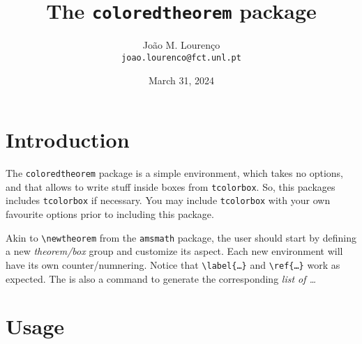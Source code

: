 \documentclass{article}
\newcommand\tcthrm{\texttt{coloredtheorem}\xspace}
\begin{document}
  \title{The \tcthrm package}
  \author{João M. Lourenço\\\texttt{\small joao.lourenco@fct.unl.pt}}
  \date{March 31, 2024}
  
  \maketitle
  

\section{Introduction}
\label{sec:introduction}

The \tcthrm package is a simple environment, which takes no options, and that allows to write stuff inside boxes from \texttt{tcolorbox}.  So, this packages includes \texttt{tcolorbox} if necessary. You may include \texttt{tcolorbox} with your own favourite options prior to including this package.

Akin to \verb!\newtheorem! from the \verb!amsmath! package, the user should start by defining a new \emph{theorem/box} group and customize its aspect. Each new environment will have its own counter/numnering. Notice that \verb!\label{…}! and \verb!\ref{…}! work as expected.  The is also a command to generate the corresponding \emph{list of …}

\section{Usage}
\label{sec:usage}
\end{document}
